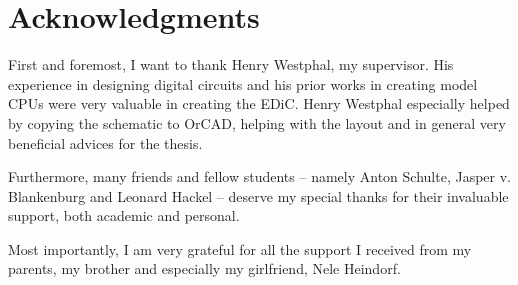 \chapter*{Acknowledgments}
First and foremost, I want to thank Henry Westphal, my supervisor.
His experience in designing digital circuits and his prior works in creating model \glspl{CPU} were very valuable in creating the \gls{EDiC}.
Henry Westphal especially helped by copying the schematic to OrCAD, helping with the layout and in general very beneficial advices for the thesis.

Furthermore, many friends and fellow students -- namely Anton Schulte, Jasper v. Blankenburg and Leonard Hackel -- deserve my special thanks for their invaluable support, both academic and personal.

Most importantly, I am very grateful for all the support I received from my parents, my brother and especially my girlfriend, Nele Heindorf.